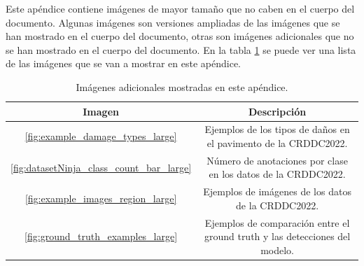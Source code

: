 
Este apéndice contiene imágenes de mayor tamaño que no caben en el cuerpo del documento. Algunas imágenes son versiones ampliadas de las imágenes que se han mostrado en el cuerpo del documento, otras son imágenes adicionales que no se han mostrado en el cuerpo del documento. En la tabla \ref{tab:larger_images} se puede ver una lista de las imágenes que se van a mostrar en este apéndice.

\begin{table}[H]
    \centering
    \begin{tabular}{|c|c|}
        \hline
        \textbf{Imagen} & \textbf{Descripción} \\ \hline
        \ref{fig:example_damage_types_large} & Ejemplos de los tipos de daños en el pavimento de la CRDDC2022. \\ \hline
        \ref{fig:datasetNinja_class_count_bar_large} & Número de anotaciones por clase en los datos de la CRDDC2022. \\ \hline
        \ref{fig:example_images_region_large} & Ejemplos de imágenes de los datos de la CRDDC2022. \\ \hline
        \ref{fig:ground_truth_examples_large} &  Ejemplos de comparación entre el ground truth y las detecciones del modelo. \\ \hline
    \end{tabular}
    \caption{Imágenes adicionales mostradas en este apéndice.}
    \label{tab:larger_images}
\end{table}
\newpage

